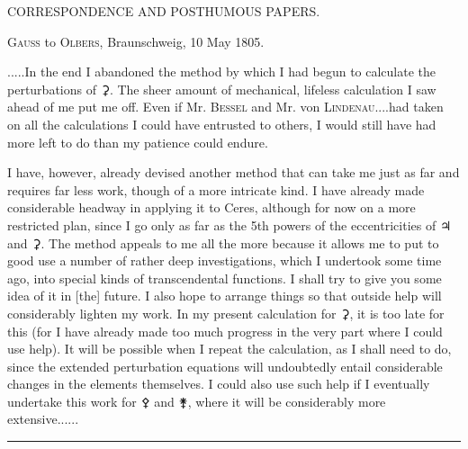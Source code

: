 \clearpage
{}
\begin{center}
{\large CORRESPONDENCE AND POSTHUMOUS PAPERS.\par}
\par
[MAY—JULY 1805.]\par
\bigskip
[1.]\par
\medskip
\textsc{Gauss} to \textsc{Olbers}, Braunschweig, 10 May 1805.
\end{center}
\noindent\hspace*{\parindent}.\quad.\quad.\quad.\quad.\quad In the end I abandoned the method by which I had begun to calculate the perturbations of {\AstroSymbols ⚳}. The sheer amount of mechanical, lifeless calculation I saw ahead of me put me off. Even if Mr. \textsc{Bessel} and Mr. von \textsc{Lindenau}\quad.\quad.\quad.\quad.\quad had taken on all the calculations I could have entrusted to others, I would still have had more left to do than my patience could endure.

I have, however, already devised another method that can take me just as far and requires far less work, though of a more intricate kind. I have already made considerable headway in applying it to Ceres, although for now on a more restricted plan, since I go only as far as the 5th powers of the eccentricities of {\AstroSymbols ♃} and {\AstroSymbols ⚳}. The method appeals to me all the more because it allows me to put to good use a number of rather deep investigations, which I undertook some time ago, into special kinds of transcendental functions. I shall try to give you some idea of it in [the] future. I also hope to arrange things so that outside help will considerably lighten my work. In my present calculation for {\AstroSymbols ⚳}, it is too late for this (for I have already made too much progress in the very part where I could use help). It will be possible when I repeat the calculation, as I shall need to do, since the extended perturbation equations will undoubtedly entail considerable changes in the elements themselves. I could also use such help if I eventually undertake this work for {\AstroSymbols ⚴} and {\AstroSymbols ⚵}, where it will be considerably more extensive.\quad.\quad.\quad.\quad.\quad.
\par\medskip
\begin{center}\rule{.30\linewidth}{.4pt}\end{center}
